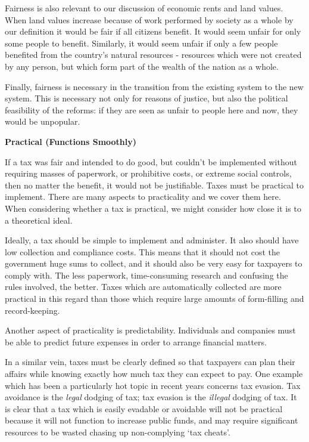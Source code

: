 \documentclass[]{tufte-handout}
\begin{document}
Fairness is also relevant to our discussion of economic rents and land
values. When land values increase because of work performed by society
as a whole by our definition it would be fair if all citizens benefit.
It would seem unfair for only some people to benefit. Similarly, it
would seem unfair if only a few people benefited from the country's
natural resources - resources which were not created by any person, but
which form part of the wealth of the nation as a whole.

Finally, fairness is necessary in the transition from the existing
system to the new system. This is necessary not only for reasons of
justice, but also the political feasibility of the reforms: if they are
seen as unfair to people here and now, they would be unpopular.

\textbf{Practical (Functions Smoothly)}

If a tax was fair and intended to do good, but couldn't be implemented
without requiring masses of paperwork, or prohibitive costs, or extreme
social controls, then no matter the benefit, it would not be
justifiable. Taxes must be practical to implement. There are many
aspects to practicality and we cover them here. When considering whether
a tax is practical, we might consider how close it is to a theoretical
ideal.

Ideally, a tax should be simple to implement and administer. It also
should have low collection and compliance costs. This means that it
should not cost the government huge sums to collect, and it should also
be very easy for taxpayers to comply with. The less paperwork,
time-consuming research and confusing the rules involved, the better.
Taxes which are automatically collected are more practical in this
regard than those which require large amounts of form-filling and
record-keeping.

Another aspect of practicality is predictability. Individuals and
companies must be able to predict future expenses in order to arrange
financial matters.

In a similar vein, taxes must be clearly defined so that taxpayers can
plan their affairs while knowing exactly how much tax they can expect to
pay. One example which has been a particularly hot topic in recent years
concerns tax evasion. Tax avoidance is the \emph{legal} dodging of tax;
tax evasion is the \emph{illegal} dodging of tax. It is clear that a tax
which is easily evadable or avoidable will not be practical because it
will not function to increase public funds, and may require significant
resources to be wasted chasing up non-complying `tax cheats'.
\end{document}
